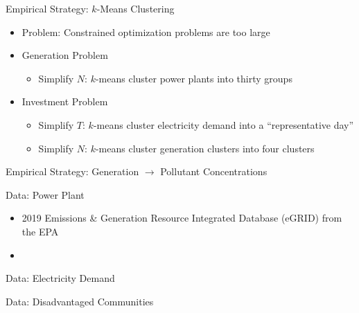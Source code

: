 \documentclass[11pt, aspectratio = 169]{beamer}
\begin{document}
\begin{frame}{Empirical Strategy: $k$-Means Clustering}
    
\begin{itemize}
    \item Problem: Constrained optimization problems are too large
    \vfill
    \item Generation Problem
    \begin{itemize}
        \item Simplify $N$: $k$-means cluster power plants into thirty groups
    \end{itemize}
    \vfill 
    \item Investment Problem
    \begin{itemize}
        \item Simplify $T$: $k$-means cluster electricity demand into a ``representative day''
        \item Simplify $N$: $k$-means cluster generation clusters into four clusters
    \end{itemize}
\end{itemize}

\end{frame}


\begin{frame}{Empirical Strategy: Generation $\to$ Pollutant Concentrations}
    
\end{frame}



\begin{frame}{Data: Power Plant}
    
    \begin{itemize}
        \item 2019 Emissions \& Generation Resource Integrated Database (eGRID) from the EPA
        \item 
    \end{itemize}

\end{frame}


\begin{frame}{Data: Electricity Demand}
    
\end{frame}


\begin{frame}{Data: Disadvantaged Communities}
    
\end{frame}
\end{document}
